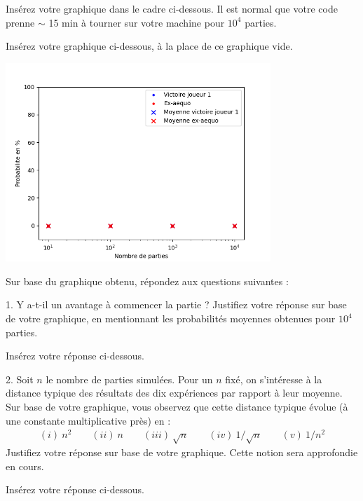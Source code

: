 \documentclass[11pt,answers]{exam}
\begin{document}
Insérez votre graphique dans le cadre ci-dessous. Il est normal que votre code prenne $\sim$ 15 min à tourner sur votre machine pour $10^4$ parties.

\begin{solutionbox}{100mm}
    Insérez votre graphique ci-dessous, à la place de ce graphique vide.

    \centering
    \includegraphics[width=0.75\textwidth]{MCplot_empty.png}
\end{solutionbox}

Sur base du graphique obtenu, répondez aux questions suivantes :

\bigskip

1. Y a-t-il un avantage à commencer la partie ? Justifiez votre réponse sur base de votre graphique, en mentionnant les probabilités moyennes obtenues pour $10^4$ parties.
    
\begin{solutionbox}{25mm}
Insérez votre réponse ci-dessous.\\


\end{solutionbox}

\medskip

2. Soit $n$ le nombre de parties simulées. Pour un $n$ fixé, on s'intéresse à la distance typique des résultats des dix expériences par rapport à leur moyenne. Sur base de votre graphique, vous observez que cette distance typique évolue (à une constante multiplicative près) en :
\begin{align*}
      (i) \ n^2 \qquad  (ii) \ n \qquad  (iii)\  \sqrt{n} \qquad (iv) \ 1/\sqrt{n} \qquad  (v) \  1/n^2
\end{align*}
Justifiez votre réponse sur base de votre graphique. Cette notion sera approfondie en cours.

\begin{solutionbox}{25mm}
Insérez votre réponse ci-dessous.\\


\end{solutionbox}
\end{document}
